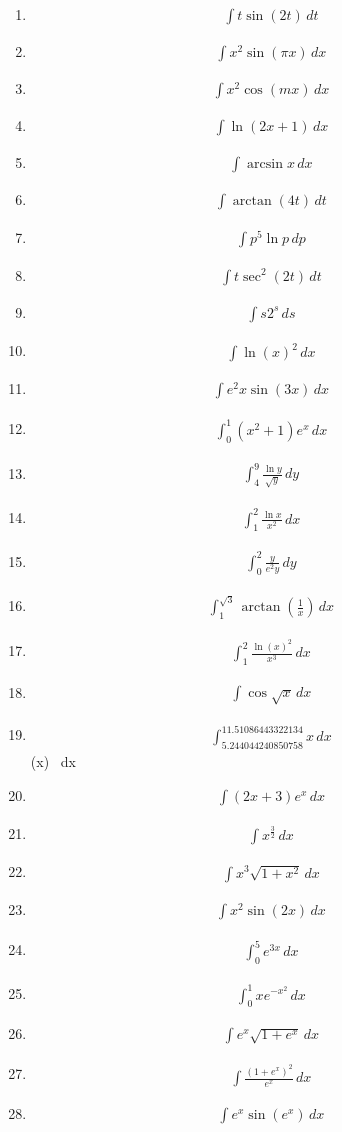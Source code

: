 \documentclass[twoside, fleqn,12pt,letterpaper]{book}
\newcommand{\makeitem}[2]{\item {#2}\begin{align*} {#1}
  \end{align*}}
\newcommand{\makeitemtextb}[1]{\makeitem{{#1}}{\cite{RosTextbook}}}
\begin{document}
\begin{multicols}{2}
\begin{enumerate}
  \makeitemtextb {\int t\sin(2t) \, dt}
  
  \makeitemtextb {\int x^2 \sin(\pi x) \, dx}
  
  \makeitemtextb {\int x^2 \cos(mx) \, dx}
  
  \makeitemtextb {\int \ln(2x+1) \, dx}
  
  \makeitemtextb {\int \arcsin x \, dx}
  
  \makeitemtextb {\int \arctan(4t) \, dt}
  
  \makeitemtextb {\int p^5\ln p \, dp}
  
  \makeitemtextb {\int t\sec^2(2t) \, dt}
  
  \makeitemtextb {\int s2^s \, ds}
  
  \makeitemtextb {\int \ln (x)^2 \, dx}
  
  \makeitemtextb {\int e^2x\sin(3x) \, dx}
  
  \makeitemtextb {\int_{0}^{1} (x^2+1)e^x  \, dx}
  
  \makeitemtextb {\int_{4}^{9}\frac{\ln y}{\sqrt{y}} \, dy}
  
  \makeitemtextb {\int_{1}^{2}\frac{\ln x}{x^2} \, dx}
  
  \makeitemtextb {\int_{0}^{2}\frac{y}{e^2y} \, dy}
  
  \makeitemtextb {\int_{1}^{\sqrt{3}}\arctan\left(\frac{1}{x}\right) \, dx}
  
  \makeitemtextb {\int_{1}^{2}\frac{\ln(x)^2}{x^3} \, dx}
  
  \makeitemtextb {\int \cos\sqrt{x}\,dx}
  
  \makeitem {{\int_{5.244044240850758}^{11.51086443322134}x \, dx}}
  
  \makeitemtextb  {\int \sin(\ln x) \, dx}
  
  \makeitemtextb {\int (2x+3)e^x \, dx}
  
  \makeitemtextb  {\int x^{\frac{3}{2}} \, dx}
  
  \makeitemtextb  {\int x^3\sqrt{1+x^2} \, dx}
  
  \makeitemtextb  {\int x^2\sin(2x) \, dx}
  
  
  \makeitemtextb{\int_{0}^{5}e^{3x} \, dx}
  
  \makeitemtextb{\int_{0}^{1}xe^{-x^2} \, dx} 
  
  \makeitemtextb{\int e^x\sqrt{1+e^x} \, dx}
  
  \makeitemtextb{\int\frac{(1+e^x)^2}{e^x} \, dx}
  
  \makeitemtextb{\int e^x\sin(e^x) \, dx}
  

\end{enumerate}
\end{multicols}
\end{document}
